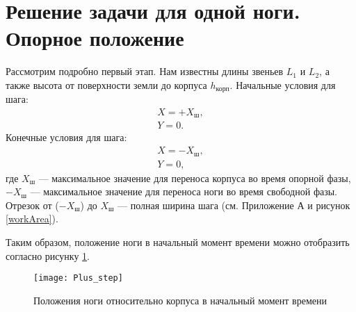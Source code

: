 \section{Решение задачи для одной ноги. Опорное положение}\label{C3_2}
Рассмотрим подробно первый этап. Нам известны длины звеньев $L_{1}$ и $L_{2}$, а также высота от поверхности земли до корпуса $h_{\text{корп}}$. 
Начальные условия для шага:
\begin{equation}
	\begin{array}{l}
		X = +X_{\text{ш}},
		\\
		Y = 0.
	\end{array}
\end{equation}
Конечные условия для шага:
\begin{equation}
	\begin{array}{l}
		X = -X_{\text{ш}},
		\\
		Y = 0,
	\end{array}
	\label{gran_step}
\end{equation}
где $X_{\text{ш}}$ --- максимальное значение для переноса корпуса во время опорной фазы, $-$$X_{\text{ш}}$ --- максимальное значение для переноса ноги во время свободной фазы. Отрезок от ($-$$X_{\text{ш}}$) до $X_{\text{ш}}$ --- полная ширина шага (см. Приложение А и рисунок \ref{workArea}).

Таким образом, положение ноги в начальный момент времени можно отобразить согласно рисунку \ref{Plus_step}.
\newline
\begin{figure}[h]
	\begin{center}
		\texttt{[image: Plus\_step]}
		\caption{Положения ноги относительно корпуса в начальный момент времени}
		\label{Plus_step}
	\end{center}
\end{figure}

